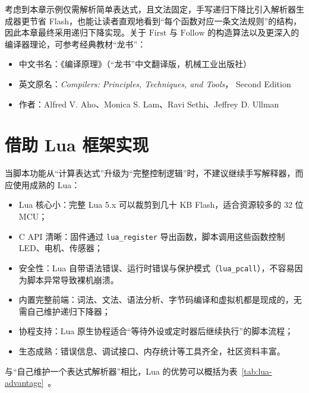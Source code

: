 考虑到本章示例仅需解析简单表达式，且文法固定，手写递归下降比引入解析器生成器更节省 Flash，也能让读者直观地看到“每个函数对应一条文法规则”的结构，因此本章最终采用递归下降实现。关于 $\mathrm{First}$ 与 $\mathrm{Follow}$ 的构造算法以及更深入的编译器理论，可参考经典教材“龙书”：

\begin{itemize}
	\item 中文书名：《编译原理》（“龙书”中文翻译版，机械工业出版社）
	\item 英文原名：\textit{Compilers: Principles, Techniques, and Tools}， Second Edition
	\item 作者：Alfred V. Aho、Monica S. Lam、Ravi Sethi、Jeffrey D. Ullman
\end{itemize}

\section{借助 Lua 框架实现}

当脚本功能从“计算表达式”升级为“完整控制逻辑”时，不建议继续手写解释器，而应使用成熟的 Lua：

\begin{itemize}
\item Lua 核心小：完整 Lua 5.x 可以裁剪到几十 KB Flash，适合资源较多的 32 位 MCU；
\item C API 清晰：固件通过 \texttt{lua\_register} 导出函数，脚本调用这些函数控制 LED、电机、传感器；
\item 安全性：Lua 自带语法错误、运行时错误与保护模式（\texttt{lua\_pcall}），不容易因为脚本异常导致裸机崩溃。
\item 内置完整前端：词法、文法、语法分析、字节码编译和虚拟机都是现成的，无需自己维护递归下降器；
\item 协程支持：Lua 原生协程适合“等待外设或定时器后继续执行”的脚本流程；
\item 生态成熟：错误信息、调试接口、内存统计等工具齐全，社区资料丰富。
\end{itemize}

与“自己维护一个表达式解析器”相比，Lua 的优势可以概括为表~\ref{tab:lua-advantage}~。


